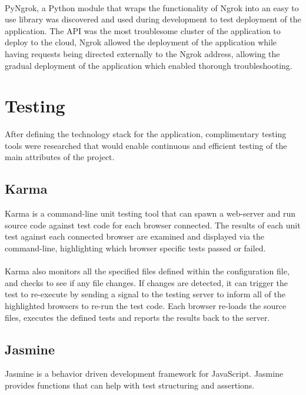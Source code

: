 \paragraph{}
PyNgrok, a Python module that wraps the functionality of Ngrok into an easy to use library was discovered and used during development to test deployment of the application. The API was the most troublesome cluster of the application to deploy to the cloud, Ngrok allowed the deployment of the application while having requests being directed externally to the Ngrok address, allowing the gradual deployment of the application which enabled thorough troubleshooting.

\section{Testing}
After defining the technology stack for the application, complimentary testing tools were researched that would enable continuous and efficient testing of the main attributes of the project.

\subsection{Karma}
Karma is a command-line unit testing tool that can spawn a web-server and run source code against test code for each browser connected. The results of each unit test against each connected browser are examined and displayed via the command-line, highlighting which browser specific tests passed or failed.

\paragraph{}
Karma also monitors all the specified files defined within the configuration file, and checks to see if any file changes. If changes are detected, it can trigger the test to re-execute by sending a signal to the testing server to inform all of the highlighted browsers to re-run the test code. Each browser re-loads the source files, executes the defined tests and reports the results back to the server.

\subsection{Jasmine}
Jasmine is a behavior driven development framework for JavaScript. Jasmine provides functions that can help with test structuring and assertions. 

